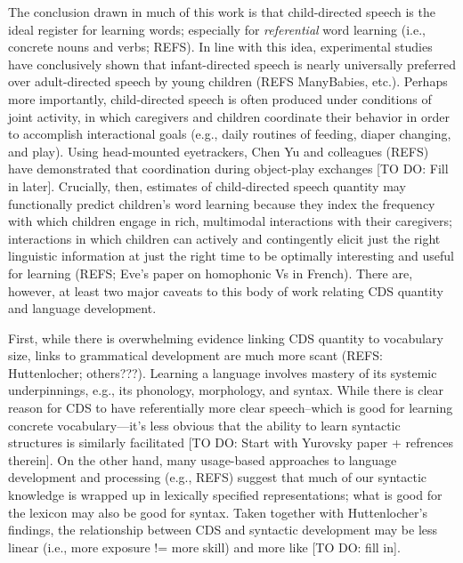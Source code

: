 \documentclass[man]{apa6}
\theoremstyle{definition}
\theoremstyle{definition}
\theoremstyle{definition}
\theoremstyle{remark}
\begin{document}
The conclusion drawn in much of this work is that child-directed speech
is the ideal register for learning words; especially for
\emph{referential} word learning (i.e., concrete nouns and verbs; REFS).
In line with this idea, experimental studies have conclusively shown
that infant-directed speech is nearly universally preferred over
adult-directed speech by young children (REFS ManyBabies, etc.). Perhaps
more importantly, child-directed speech is often produced under
conditions of joint activity, in which caregivers and children
coordinate their behavior in order to accomplish interactional goals
(e.g., daily routines of feeding, diaper changing, and play). Using
head-mounted eyetrackers, Chen Yu and colleagues (REFS) have
demonstrated that coordination during object-play exchanges {[}TO DO:
Fill in later{]}. Crucially, then, estimates of child-directed speech
quantity may functionally predict children's word learning because they
index the frequency with which children engage in rich, multimodal
interactions with their caregivers; interactions in which children can
actively and contingently elicit just the right linguistic information
at just the right time to be optimally interesting and useful for
learning (REFS; Eve's paper on homophonic Vs in French). There are,
however, at least two major caveats to this body of work relating CDS
quantity and language development.

First, while there is overwhelming evidence linking CDS quantity to
vocabulary size, links to grammatical development are much more scant
(REFS: Huttenlocher; others???). Learning a language involves mastery of
its systemic underpinnings, e.g., its phonology, morphology, and syntax.
While there is clear reason for CDS to have referentially more clear
speech--which is good for learning concrete vocabulary---it's less
obvious that the ability to learn syntactic structures is similarly
facilitated {[}TO DO: Start with Yurovsky paper + refrences therein{]}.
On the other hand, many usage-based approaches to language development
and processing (e.g., REFS) suggest that much of our syntactic knowledge
is wrapped up in lexically specified representations; what is good for
the lexicon may also be good for syntax. Taken together with
Huttenlocher's findings, the relationship between CDS and syntactic
development may be less linear (i.e., more exposure != more skill) and
more like {[}TO DO: fill in{]}.
\end{document}
